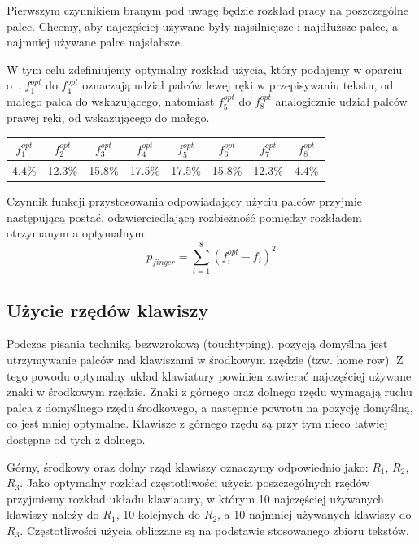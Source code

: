 \documentclass[brudnopis]{xmgr}
\begin{document}
Pierwszym czynnikiem branym pod uwagę będzie rozkład pracy na poszczególne palce. Chcemy, aby najczęściej używane były najsilniejsze i najdłuższe palce, a najmniej używane palce najsłabsze.

W tym celu zdefiniujemy optymalny rozkład użycia, który podajemy w oparciu o~\cite{Eggers2003672}. $f^{opt}_1$ do $f^{opt}_4$ oznaczają udział palców lewej ręki w przepisywaniu tekstu, od małego palca do wskazującego, natomiast $f^{opt}_5$ do $f^{opt}_8$ analogicznie udział palców prawej ręki, od wskazującego do małego.\newline

\begin{tabular}{ c | c | c | c | c | c | c | c }
  $f^{opt}_1$ & $f^{opt}_2$ & $f^{opt}_3$ & $f^{opt}_4$ & $f^{opt}_5$ & $f^{opt}_6$ & $f^{opt}_7$ & $f^{opt}_8$ \\
  \hline
  4.4\% & 12.3\% & 15.8\% & 17.5\% & 17.5\% & 15.8\% & 12.3\% & 4.4\% \\
\end{tabular}\newline

Czynnik funkcji przystosowania odpowiadający użyciu palców przyjmie następującą postać, odzwierciedlającą rozbieżność pomiędzy rozkładem otrzymanym a optymalnym:
$$ p_{finger} = \sum\limits_{i = 1}^{8} (f_i^{opt} - f_i)^2 $$


\subsection{Użycie rzędów klawiszy}

Podczas pisania techniką bezwzrokową (touchtyping), pozycją domyślną jest utrzymywanie palców nad klawiszami w środkowym rzędzie (tzw. home row). Z tego powodu optymalny układ klawiatury powinien zawierać najczęściej używane znaki w środkowym rzędzie. Znaki z górnego oraz dolnego rzędu wymagają ruchu palca z domyślnego rzędu środkowego, a następnie powrotu na pozycję domyślną, co jest mniej optymalne. Klawisze z górnego rzędu są przy tym nieco łatwiej dostępne od tych z dolnego.

Górny, środkowy oraz dolny rząd klawiszy oznaczymy odpowiednio jako: $R_1$, $R_2$, $R_3$. Jako optymalny rozkład częstotliwości użycia poszczególnych rzędów przyjmiemy rozkład układu klawiatury, w którym 10 najczęściej używanych klawiszy należy do $R_1$, 10 kolejnych do $R_2$, a 10 najmniej używanych klawiszy do $R_3$. Częstotliwości użycia obliczane są na podstawie stosowanego zbioru tekstów.
\end{document}
